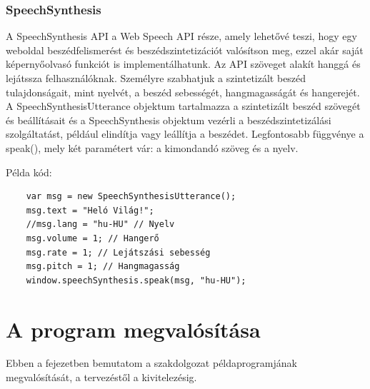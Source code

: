 \documentclass[12pt]{report}
\begin{document}
\subsection{SpeechSynthesis}
A SpeechSynthesis \cite{speechsynthesis} API a Web Speech API része, amely lehetővé teszi, hogy egy weboldal beszédfelismerést és beszédszintetizációt valósítson meg, ezzel akár saját képernyőolvasó funkciót is implementálhatunk. Az API szöveget alakít hanggá és lejátssza felhasználóknak. Személyre szabhatjuk a szintetizált beszéd tulajdonságait, mint nyelvét, a beszéd sebességét, hangmagasságát és hangerejét. A SpeechSynthesisUtterance objektum tartalmazza a szintetizált beszéd szövegét és beállításait és a SpeechSynthesis objektum vezérli a beszédszintetizálási szolgáltatást, például elindítja vagy leállítja a beszédet. Legfontosabb függvénye a speak(), mely két paramétert vár: a kimondandó szöveg és a nyelv.

Példa kód:
\begin{verbatim}
    var msg = new SpeechSynthesisUtterance();
    msg.text = "Heló Világ!";
    //msg.lang = "hu-HU" // Nyelv
    msg.volume = 1; // Hangerő
    msg.rate = 1; // Lejátszási sebesség
    msg.pitch = 1; // Hangmagasság
    window.speechSynthesis.speak(msg, "hu-HU");
\end{verbatim}
\pagebreak
\chapter{A program megvalósítása}
Ebben a fejezetben bemutatom a szakdolgozat példaprogramjának megvalósítását, a tervezéstől a kivitelezésig.
\end{document}
